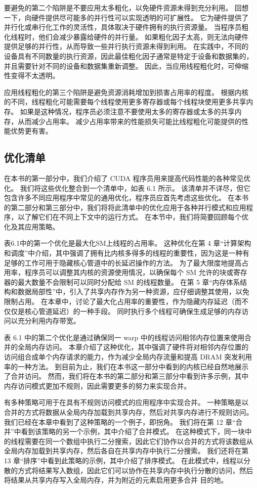 要避免的第二个陷阱是不要应用太多粗化，以免硬件资源未得到充分利用。 回想一下，向硬件提供尽可能多的并行性可以实现透明的可扩展性。 它为硬件提供了并行化或串行化工作的灵活性，具体取决于硬件拥有的执行资源量。 当程序员粗化线程时，他们会减少暴露给硬件的并行量。 如果粗化因子太高，则无法向硬件提供足够的并行性，从而导致一些并行执行资源未得到利用。 在实践中，不同的设备具有不同数量的执行资源，因此最佳粗化因子通常是特定于设备和数据集的，并且需要针对不同的设备和数据集重新调整。 因此，当应用线程粗化时，可伸缩性变得不太透明。

应用线程粗化的第三个陷阱是避免资源消耗增加到损害占用率的程度。 根据内核的不同，线程粗化可能需要每个线程使用更多寄存器或每个线程块使用更多共享内存。 如果是这种情况，程序员必须注意不要使用太多的寄存器或太多的共享内存，从而减少占用率。 减少占用率带来的性能损失可能比线程粗化可能提供的性能优势更有害。

\subsection{优化清单}
在本书的第一部分中，我们介绍了 CUDA 程序员用来提高代码性能的各种常见优化。 我们将这些优化整合到一个清单中，如表 6.1 所示。 该清单并不详尽，但它包含许多不同应用程序中常见的通用优化，程序员应首先考虑这些优化。 在本书的第二部分和第三部分中，我们将将此清单中的优化应用于各种并行模式和应用程序，以了解它们在不同上下文中的运行方式。 在本节中，我们将简要回顾每个优化及其应用策略。

表6.1中的第一个优化是最大化SM上线程的占用率。 这种优化在第 4 章“计算架构和调度”中介绍，其中强调了拥有比内核多得多的线程的重要性，因为这是一种有足够的工作可用于隐藏核心管道中的长延迟操作的方法。 为了最大限度地提高占用率，程序员可以调整其内核的资源使用情况，以确保每个 SM 允许的块或寄存器的最大数量不会限制可以同时分配给 SM 的线程数量。 在第 5 章“内存体系结构和数据局部性”中，引入了共享内存作为另一种资源，应仔细调整其使用，以免限制占用。 在本章中，讨论了最大化占用率的重要性，作为隐藏内存延迟（而不仅仅是核心管道延迟）的一种手段。 同时执行多个线程可确保生成足够的内存访问以充分利用内存带宽。

表 6.1 中的第二个优化是通过确保同一 warp 中的线程访问相邻内存位置来使用合并的全局内存访问。 本章介绍了这种优化，其中强调了硬件将对相邻内存位置的访问组合成单个内存请求的能力，作为减少全局内存流量和提高 DRAM 突发利用率的一种方法。 到目前为止，我们在本书这一部分中看到的内核已经自然地展示了合并访问。 然而，我们将在本书的第二部分和第三部分中看到许多示例，其中内存访问模式更加不规则，因此需要更多的努力来实现合并。

有多种策略可用于在具有不规则访问模式的应用程序中实现合并。 一种策略是以合并的方式将数据从全局内存加载到共享内存，然后对共享内存进行不规则访问。 我们已经在本章中看到了这种策略的一个例子，即拐角。 我们将在第 12 章“合并”中看到该策略的另一个示例，其中介绍了合并模式。 在这种模式下，同一块中的线程需要在同一个数组中执行二分搜索，因此它们协作以合并的方式将该数组从全局内存加载到共享内存，然后各自在共享内存中执行二分搜索。 我们还将在第 13 章“排序”中看到此策略的示例，其中介绍了排序模式。 在此模式中，线程以分散的方式将结果写入数组，因此它们可以协作在共享内存中执行分散的访问，然后将结果从共享内存写入全局内存，并为附近的元素启用更多合并 目的地。

